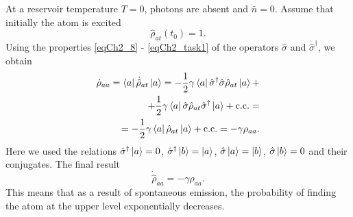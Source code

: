 At a reservoir temperature $T = 0$, photons are absent and $\bar{n} = 0$. Assume that initially the atom is excited 
\[
\hat{\rho}_{at}\left(t_0\right) = 1.
\]
Using the properties \eqref{eqCh2_8} - \eqref{eqCh2_task1} of the operators $\hat{\sigma}$ and $\hat{\sigma}^{\dag}$, we obtain   
\begin{eqnarray}
\dot{\rho}_{aa} = \bra{a}\dot{\hat{\rho}}_{at}\ket{a} =
-\frac{1}{2}\gamma
\bra{a}\hat{\sigma}^{\dag}\hat{\sigma}\hat{\rho}_{at}\ket{a}
+ 
\nonumber \\
+ \frac{1}{2}\gamma
\bra{a}\hat{\sigma}\hat{\rho}_{at}\hat{\sigma}^{\dag}\ket{a}
+ \mbox{c.c.} = 
\nonumber \\
= 
- \frac{1}{2}\gamma
\bra{a}\hat{\rho}_{at}\ket{a} + \mbox{c.c.} = 
- \gamma \rho_{aa}.
\label{eqCh2_101}
\end{eqnarray}
Here we used the relations
\(\hat{\sigma}^{\dag}\ket{a} = 0\),
\(\hat{\sigma}^{\dag}\ket{b} = \ket{a}\),
\(\hat{\sigma}\ket{a} = \ket{b}\),
\(\hat{\sigma}\ket{b} = 0\)
and their conjugates. The final result 
\begin{equation}
\dot{\hat{\rho}}_{aa} = - \gamma \rho_{aa}.
\label{eqCh2_102}
\end{equation}
This means that as a result of spontaneous emission, the probability of finding the atom at the upper level exponentially decreases. 